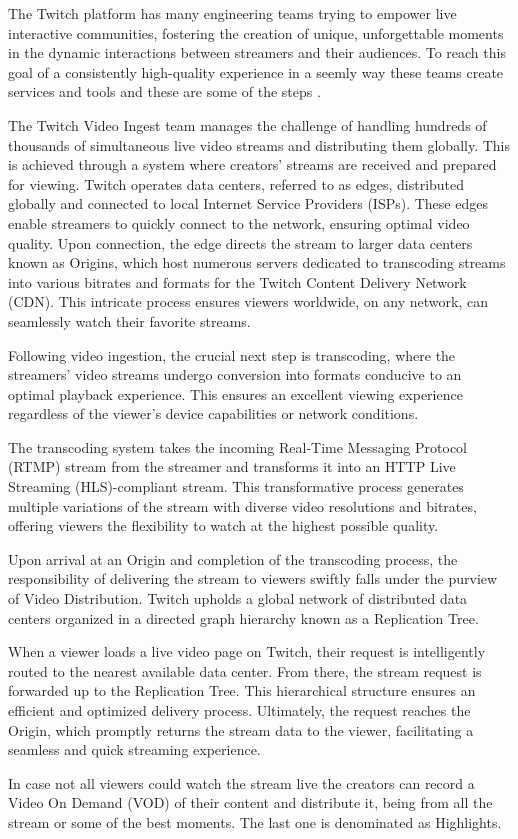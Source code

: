     The Twitch platform has many engineering teams trying to empower live interactive communities, fostering the creation of unique, unforgettable moments in the dynamic interactions between streamers and their audiences. To reach this goal of a consistently high-quality experience in a seemly way these teams create services and tools and these are some of the steps \cite{TwitchEngineering}.

    The Twitch Video Ingest team manages the challenge of handling hundreds of thousands of simultaneous live video streams and distributing them globally. This is achieved through a system where creators' streams are received and prepared for viewing. Twitch operates data centers, referred to as edges, distributed globally and connected to local Internet Service Providers (ISPs). These edges enable streamers to quickly connect to the network, ensuring optimal video quality. Upon connection, the edge directs the stream to larger data centers known as Origins, which host numerous servers dedicated to transcoding streams into various bitrates and formats for the Twitch Content Delivery Network (CDN). This intricate process ensures viewers worldwide, on any network, can seamlessly watch their favorite streams.

    Following video ingestion, the crucial next step is transcoding, where the streamers' video streams undergo conversion into formats conducive to an optimal playback experience. This ensures an excellent viewing experience regardless of the viewer's device capabilities or network conditions.

    The transcoding system takes the incoming Real-Time Messaging Protocol (RTMP) stream from the streamer and transforms it into an HTTP Live Streaming (HLS)-compliant stream. This transformative process generates multiple variations of the stream with diverse video resolutions and bitrates, offering viewers the flexibility to watch at the highest possible quality.

    Upon arrival at an Origin and completion of the transcoding process, the responsibility of delivering the stream to viewers swiftly falls under the purview of Video Distribution. Twitch upholds a global network of distributed data centers organized in a directed graph hierarchy known as a Replication Tree.

    When a viewer loads a live video page on Twitch, their request is intelligently routed to the nearest available data center. From there, the stream request is forwarded up to the Replication Tree. This hierarchical structure ensures an efficient and optimized delivery process. Ultimately, the request reaches the Origin, which promptly returns the stream data to the viewer, facilitating a seamless and quick streaming experience.

    In case not all viewers could watch the stream live the creators can record a Video On Demand (VOD) of their content and distribute it, being from all the stream or some of the best moments. The last one is denominated as Highlights.

